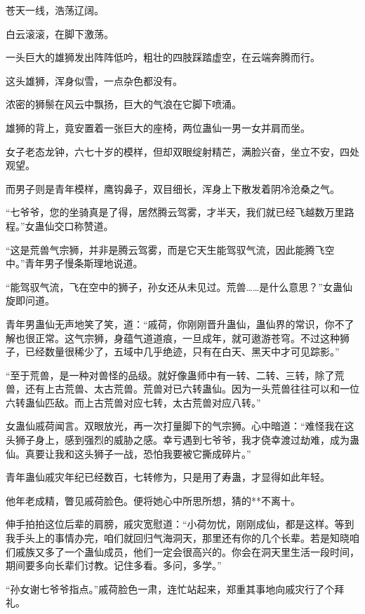 
\begin{this_body}

苍天一线，浩荡辽阔。

白云滚滚，在脚下激荡。

一头巨大的雄狮发出阵阵低吟，粗壮的四肢踩踏虚空，在云端奔腾而行。

这头雄狮，浑身似雪，一点杂色都没有。

浓密的狮鬃在风云中飘扬，巨大的气浪在它脚下喷涌。

雄狮的背上，竟安置着一张巨大的座椅，两位蛊仙一男一女并肩而坐。

女子老态龙钟，六七十岁的模样，但却双眼绽射精芒，满脸兴奋，坐立不安，四处观望。

而男子则是青年模样，鹰钩鼻子，双目细长，浑身上下散发着阴冷沧桑之气。

“七爷爷，您的坐骑真是了得，居然腾云驾雾，才半天，我们就已经飞越数万里路程。”女蛊仙交口称赞道。

“这是荒兽气宗狮，并非是腾云驾雾，而是它天生能驾驭气流，因此能腾飞空中。”青年男子慢条斯理地说道。

“能驾驭气流，飞在空中的狮子，孙女还从未见过。荒兽……是什么意思？”女蛊仙旋即问道。

青年男蛊仙无声地笑了笑，道：“戚荷，你刚刚晋升蛊仙，蛊仙界的常识，你不了解也很正常。这气宗狮，身蕴气道道痕，一旦成年，就可遨游苍穹。不过这种狮子，已经数量很稀少了，五域中几乎绝迹，只有在白天、黑天中才可见踪影。”

“至于荒兽，是一种对兽怪的品级。就好像蛊师中有一转、二转、三转，除了荒兽，还有上古荒兽、太古荒兽。荒兽对已六转蛊仙。因为一头荒兽往往可以和一位六转蛊仙匹敌。而上古荒兽对应七转，太古荒兽对应八转。”

女蛊仙戚荷闻言。双眼放光，再一次打量脚下的气宗狮。心中暗道：“难怪我在这头狮子身上，感到强烈的威胁之感。幸亏遇到七爷爷，我才侥幸渡过劫难，成为蛊仙。真要让我和这头狮子一战，恐怕我要被它撕成碎片。”

青年蛊仙戚灾年纪已经数百，七转修为，只是用了寿蛊，才显得如此年轻。

他年老成精，瞥见戚荷脸色。便将她心中所思所想，猜的**不离十。

伸手拍拍这位后辈的肩膀，戚灾宽慰道：“小荷勿忧，刚刚成仙，都是这样。等到我手头上的事情办完，咱们就回归气海洞天，那里还有你的几个长辈。若是知晓咱们戚族又多了一个蛊仙成员，他们一定会很高兴的。你会在洞天里生活一段时间，期间要多向长辈们讨教。记住多看。多问，多学。”

“孙女谢七爷爷指点。”戚荷脸色一肃，连忙站起来，郑重其事地向戚灾行了个拜礼。


\end{this_body}

